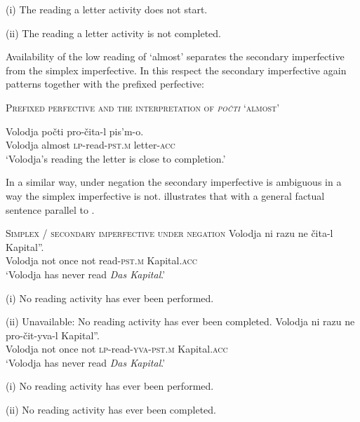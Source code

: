 \documentclass[output=paper,colorlinks,citecolor=brown]{langscibook}
\begin{document}
(i) The reading a letter activity does not start.

(ii) The reading a letter activity is not completed.\label{ex:tatevosov:59b}
\z
\z

\noindent Availability of the low reading of ‘almost’ separates the secondary imperfective from the simplex imperfective. In this respect the secondary imperfective again patterns together with the prefixed perfective: 

\ea     \textsc{Prefixed perfective and the interpretation of \textit{počti} ‘almost’}\label{ex:tatevosov:60}

\gll  Volodja  počti  pro-čita-l  pis’m-o.\\
  Volodja    almost  \textsc{lp}-read-\textsc{pst.m}  letter-\textsc{acc}\\
\glt ‘Volodja’s reading the letter is close to completion.’ 
\z

\noindent In a similar way, under negation the secondary imperfective is ambiguous in a way the simplex imperfective is not.  illustrates that with a general factual sentence parallel to .

\ea    \textsc{Simplex / secondary imperfective under negation}\label{tat:ex:61}
\ea
\gll Volodja  ni  razu  ne  čita-l   Kapital”.\\
    Volodja  not  once  not  read-\textsc{pst.m}  {} Kapital.\textsc{acc}\\
\glt  ‘Volodja has never read \textit{Das Kapital}.’

(i) No reading activity has ever been performed.

(ii) Unavailable: No reading activity has ever been completed.\label{ex:tatevosov:61a}
\ex
\gll   Volodja   ni   razu  ne  pro-čit-yva-l    Kapital”.\\
    Volodja  not   once  not  \textsc{lp}-read\textsc{-yva-pst.m} {} Kapital.\textsc{acc}\\
\glt  ‘Volodja has never read \textit{Das Kapital}.’

(i) No reading activity has ever been performed.

(ii) No reading activity has ever been completed.\label{ex:tatevosov:61b}
\z
\z
\end{document}
